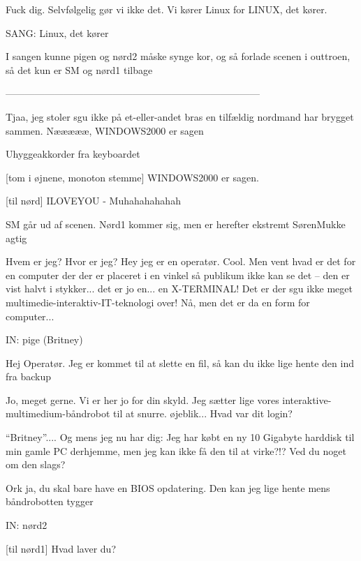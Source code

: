 \documentclass[danish]{article}
\begin{document}
\begin{sketch}
 Fuck dig. Selvfølgelig gør vi ikke det. Vi kører Linux  for LINUX, det kører.

\scene SANG: Linux, det kører

\scene I sangen kunne pigen og nørd2 måske synge kor, og så forlade scenen i
outtroen, så det kun er SM og nørd1 tilbage

\scene ------------------------------------------------------------------------------

 Tjaa, jeg stoler sgu ikke på et-eller-andet bras en tilfældig nordmand
har brygget sammen.  Næææææ, WINDOWS2000 er sagen

\scene Uhyggeakkorder fra keyboardet

[tom i øjnene, monoton stemme] WINDOWS2000 er sagen.

[til nørd] ILOVEYOU - Muhahahahahah

\scene SM går ud af scenen. Nørd1 kommer sig, men er herefter ekstremt
SørenMukke agtig 

 Hvem er jeg? Hvor er jeg? Hey jeg er en operatør. Cool. Men vent
hvad er det for en computer der der er placeret i en vinkel så publikum ikke kan
se det -- den er vist halvt i stykker... det er jo en... en X-TERMINAL! Det er
der sgu ikke meget multimedie-interaktiv-IT-teknologi over! Nå, men det er da en
form for computer... 

\scene IN: pige (Britney)

 Hej Operatør. Jeg er kommet til at slette en fil, så kan du ikke
lige hente den ind fra backup 

 Jo, meget gerne. Vi er her jo for din skyld. Jeg sætter lige vores
interaktive-multimedium-båndrobot til at snurre. øjeblik... Hvad var dit login?

 ``Britney''.... Og mens jeg nu har dig: Jeg har købt en ny 10
Gigabyte harddisk til min gamle PC derhjemme, men jeg kan ikke få den til at
virke?!? Ved du noget om den slags?

 Ork ja, du skal bare have en BIOS opdatering. Den kan jeg lige
hente mens båndrobotten tygger 

\scene IN: nørd2

[til nørd1] Hvad laver du?


\end{sketch}
\end{document}
